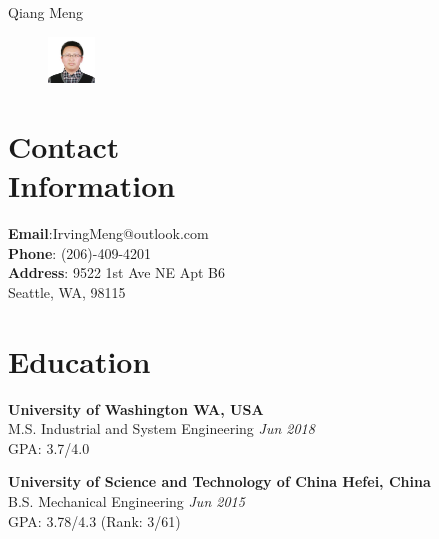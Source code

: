 \documentclass[margin,line]{resume}
\begin{document}
{\sc \Large Qiang Meng}
\begin{resume}


    \vspace{0.5cm}
    \begin{figure}
         \vspace{-0.9cm}
        \begin{center}
        \includegraphics[width=0.11\textwidth]{face}
        \end{center}
         \vspace{-1cm}
    \end{figure}

 
    \section{\mysidestyle Contact\\Information}
    \textbf{Email}:\hspace{1.5em}\quad  IrvingMeng@outlook.com \\
    \textbf{Phone}: \hspace{1.5em} (206)-409-4201\\ 
    \textbf{Address}: \hspace{1em}9522 1st Ave NE Apt B6\\
     \hspace*{6em}Seattle, WA, 98115\\     


     \section{\mysidestyle Education}
 \textbf{University of Washington  \hfill WA, USA}\\
 M.S. Industrial and System Engineering \hfill \textit{Jun 2018}\\
 GPA: 3.7/4.0 \par

 \textbf{University of Science and Technology of China \hfill Hefei, China}\\
 B.S. Mechanical Engineering \hfill \textit{Jun 2015}\\
 GPA: 3.78/4.3 (Rank: 3/61)
           

\end{resume}
\end{document}
